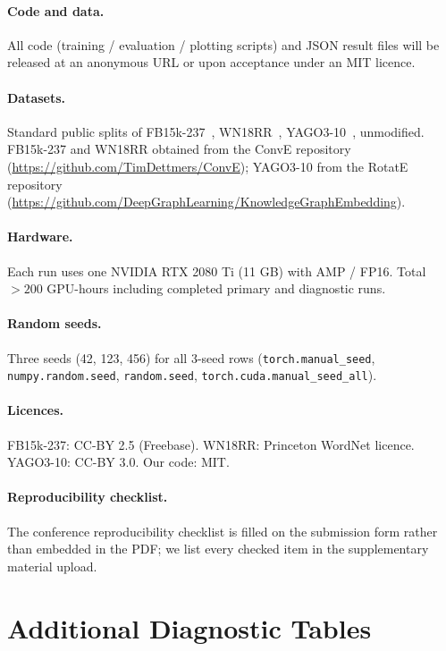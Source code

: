 \paragraph{Code and data.} All code (training / evaluation / plotting scripts) and JSON result files will be released at an anonymous URL or upon acceptance under an MIT licence.

\paragraph{Datasets.} Standard public splits of FB15k-237~\citep{fb15k237}, WN18RR~\citep{wn18rr}, YAGO3-10~\citep{yago310}, unmodified. FB15k-237 and WN18RR obtained from the ConvE repository (\url{https://github.com/TimDettmers/ConvE}); YAGO3-10 from the RotatE repository (\url{https://github.com/DeepGraphLearning/KnowledgeGraphEmbedding}).

\paragraph{Hardware.} Each run uses one NVIDIA RTX 2080 Ti (11 GB) with AMP / FP16. Total $>200$ GPU-hours including completed primary and diagnostic runs.

\paragraph{Random seeds.} Three seeds (42, 123, 456) for all 3-seed rows (\texttt{torch.manual\_seed}, \texttt{numpy.random.seed}, \texttt{random.seed}, \texttt{torch.cuda.manual\_seed\_all}).

\paragraph{Licences.} FB15k-237: CC-BY 2.5 (Freebase). WN18RR: Princeton WordNet licence. YAGO3-10: CC-BY 3.0. Our code: MIT.

\paragraph{Reproducibility checklist.} The conference reproducibility checklist is filled on the submission form rather than embedded in the PDF; we list every checked item in the supplementary material upload.

\section{Additional Diagnostic Tables}


